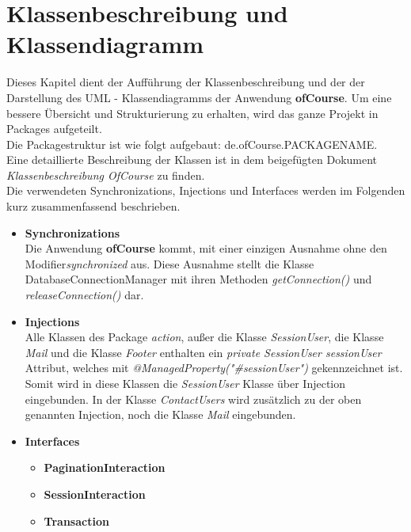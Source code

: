 \chapter{Klassenbeschreibung und Klassendiagramm}
	\newcommand{\class}[1]{\paragraph{Klasse #1:}\ \\ }
	\newcommand{\interface}[1]{\paragraph{Interface #1:}\ \\ }
	\newcommand{\method}[1]{\textcolor{blue}{#1}}
	\newcommand{\kursiv}[1]{{\it #1}}
	\newcommand{\override}{{\it @Override}\ \\}
	
	Dieses Kapitel dient der Aufführung der Klassenbeschreibung und der der Darstellung des UML - Klassendiagramms der Anwendung \textbf{ofCourse}.
	Um eine bessere Übersicht und Strukturierung zu erhalten, wird das ganze Projekt in Packages aufgeteilt.\\
	Die Packagestruktur ist wie folgt aufgebaut: de.ofCourse.PACKAGENAME.\\
	Eine detaillierte Beschreibung der Klassen ist in dem beigefügten Dokument \kursiv{Klassenbeschreibung OfCourse} zu finden.\\
	Die verwendeten Synchronizations, Injections und Interfaces werden im Folgenden kurz zusammenfassend
	beschrieben.
	\begin{itemize}
		\item \textbf{Synchronizations}\\
		Die Anwendung \textbf{ofCourse} kommt, mit einer einzigen Ausnahme ohne den Modifier\kursiv{synchronized} aus. Diese Ausnahme stellt die Klasse DatabaseConnectionManager mit ihren Methoden \kursiv{getConnection()}  und \kursiv{releaseConnection()} dar.
		\item \textbf{Injections}\\
		Alle Klassen des Package \kursiv{action}, außer die Klasse \kursiv{SessionUser}, die Klasse
		\kursiv{Mail} und die Klasse \kursiv{Footer} enthalten ein \kursiv{private SessionUser sessionUser} Attribut, welches mit \kursiv{@ManagedProperty("\#sessionUser")} gekennzeichnet
		ist. Somit wird in diese Klassen die \kursiv{SessionUser} Klasse
		über Injection eingebunden.
		In der Klasse \kursiv{ContactUsers} wird zusätzlich zu der oben genannten Injection, noch die Klasse \kursiv{Mail}
		eingebunden.
		\item \textbf{Interfaces}
		\begin{itemize}
			\item \textbf{PaginationInteraction}
			\item \textbf{SessionInteraction}
			\item \textbf{Transaction}
		\end{itemize}
	\end{itemize}
	
